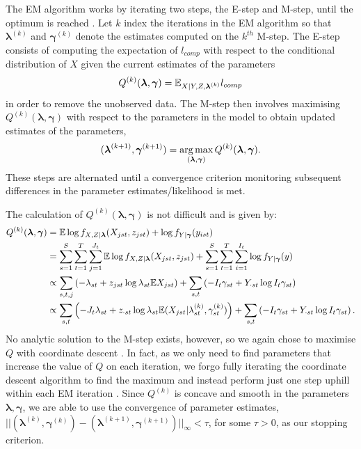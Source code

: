 \documentclass[12pt]{article}
\begin{document}
The EM algorithm works by iterating two steps, the E-step and M-step, until the optimum is reached \citep{Dempster:1977,McLachlan:2007}.  Let $k$ index the iterations in the EM algorithm so that $\boldsymbol \lambda^{(k)}$ and $\boldsymbol \gamma^{(k)}$ denote the estimates computed on the $k^{th}$ M-step. The E-step consists of computing the expectation of $l_{comp}$ with respect to the conditional distribution of $X$ given the current estimates of the parameters
\[
Q^{(k)}(\boldsymbol{\lambda},\boldsymbol{\gamma}) = \mathbb{E}_{X|Y,Z,\boldsymbol{\lambda}^{(k)}} l_{comp}
\]
in order to remove the unobserved data. The M-step then involves maximising $Q^{(k)}(\boldsymbol{\lambda},\boldsymbol{\gamma})$ with respect to the parameters in the model to obtain updated estimates of the parameters,
\[
(\boldsymbol{\lambda}^{(k+1)}, \boldsymbol{\gamma}^{(k+1)}) = \operatorname*{arg\,max}_{(\boldsymbol{\lambda}, \boldsymbol{\gamma})} Q^{(k)}(\boldsymbol{\lambda}, \boldsymbol{\gamma}).
\]
These steps are alternated until a convergence criterion monitoring subsequent differences in the parameter estimates/likelihood is met.  

The calculation of $Q^{(k)}(\boldsymbol{\lambda}, \boldsymbol{\gamma})$ is not difficult and is given by:
\begin{align}
  \label{eq:estep}
  \begin{split}
  Q^{(k)}(\boldsymbol{\lambda}, \boldsymbol{\gamma})
  & = \mathbb{E} \log{f_{X,Z|\boldsymbol{\lambda}}(X_{jst},z_{jst})} + \log{f_{Y|\boldsymbol{\gamma}}(y_{ist})} \\
  & = \sum_{s=1}^S \sum_{t=1}^T \sum_{j=1}^{J_t} \mathbb{E} \log{f_{X,Z|\boldsymbol{\lambda}}(X_{jst},z_{jst})}
  + \sum_{s=1}^S \sum_{t=1}^T \sum_{i=1}^{I_t} \log{f_{Y|\boldsymbol{\gamma}}(y)} \\
  & \propto \sum_{s,t,j} \left( - \lambda_{st} 
    + z_{jst} \log{\lambda_{st}} \mathbb{E} X_{jst} \right) + \sum_{s,t} \left( -I_t \gamma_{st} + Y_{\cdot st} \log{I_t \gamma_{st}} \right) \\
  & \propto \sum_{s,t} \left( -J_t \lambda_{st} + z_{\cdot st} \log{\lambda_{st}} \mathbb{E} (X_{jst}|\lambda_{st}^{(k)},\gamma_{st}^{(k)}) \right) + \sum_{s,t} \left( -I_t \gamma_{st} + Y_{\cdot st} \log{I_t \gamma_{st}} \right).
\end{split}
\end{align}
\noindent No analytic solution to the M-step exists, however, so we again chose to maximise $Q$ with coordinate descent \citep{Luo:1992}.  In fact, as we only need to find parameters that increase the value of $Q$ on each iteration, we forgo fully iterating the coordinate descent algorithm to find the maximum and instead perform just one step uphill within each EM iteration \citep{Givens:2012}.  Since $Q^{(k)}$ is concave and smooth in the parameters $\boldsymbol{\lambda}, \boldsymbol{\gamma}$, we are able to use the convergence of parameter estimates, $||(\boldsymbol{\lambda}^{(k)}, \boldsymbol{\gamma}^{(k)}) - (\boldsymbol{\lambda}^{(k+1)}, \boldsymbol{\gamma}^{(k+1)})||_{\infty} < \tau $, for some $\tau>0$, as our stopping criterion.
\end{document}
